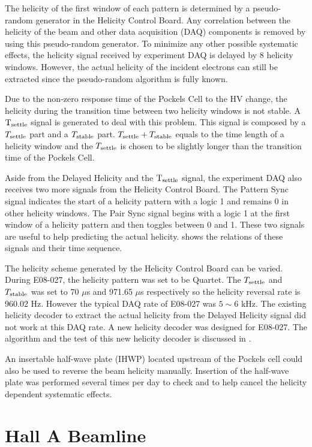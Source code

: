 The helicity of the first window of each pattern is determined by a pseudo-random generator in the Helicity Control Board. Any correlation between the helicity of the beam and other data acquisition (DAQ) components is removed by using this pseudo-random generator. To minimize any other possible systematic effects, the helicity signal received by experiment DAQ is delayed by 8 helicity windows. However, the actual helicity of the incident electrons can still be extracted since the pseudo-random algorithm is fully known.

Due to the non-zero response time of the Pockels Cell to the HV change, the helicity during the transition time between two helicity windows is not stable. A $\mathrm{T}_{\mathrm{settle}}$ signal is generated to deal with this problem. This signal is composed by a $T_{\mathrm{settle}}$ part and a $T_{\mathrm{stable}}$ part. $T_{\mathrm{settle}}+T_{\mathrm{stable}}$ equals to the time length of a helicity window and the $T_{\mathrm{settle}}$ is chosen to be slightly longer than the transition time of the Pockels Cell.

Aside from the Delayed Helicity and the $\mathrm{T}_{\mathrm{settle}}$ signal, the experiment DAQ also receives two more signals from the Helicity Control Board. The Pattern Sync signal indicates the start of a helicity pattern with a logic 1 and remains 0 in other helicity windows. The Pair Sync signal begins with a logic 1 at the first window of a helicity pattern and then toggles between 0 and 1. These two signals are useful to help predicting the actual helicity.  shows the relations of these signals and their time sequence.

The helicity scheme generated by the Helicity Control Board can be varied. During E08-027, the helicity pattern was set to be Quartet. The $T_{\mathrm{settle}}$ and $T_{\mathrm{stable}}$ was set to 70 $\mu$s and 971.65 $\mu$s respectively so the helicity reversal rate is 960.02 Hz. However the typical DAQ rate of E08-027 was $5\sim6$ kHz. The existing helicity decoder to extract the actual helicity from the Delayed Helicity signal did not work at this DAQ rate. A new helicity decoder was designed for E08-027. The algorithm and the test of this new helicity decoder is discussed in .

An insertable half-wave plate (IHWP) located upstream of the Pockels cell could also be used to reverse the beam helicity manually. Insertion of the half-wave plate was performed several times per day to check and to help cancel the helicity dependent systematic effects.

\section{Hall A Beamline}
\label{C5S2}

